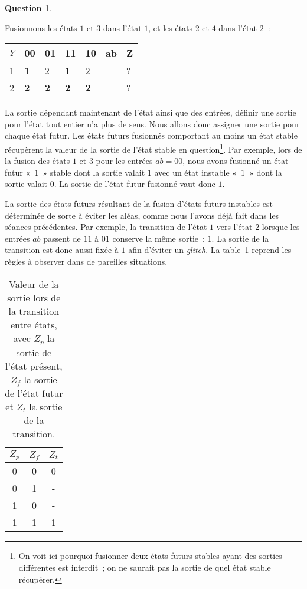 \documentclass[11pt,a4paper,dvipsnames,]{article}
\theoremstyle{definition}%
\newtheorem{Q}{Question}[] %
\begin{document}
\begin{Q}
{\begin{enumerate}
		Fusionnons les états $1$ et $3$ dans l'état $1$, et les états $2$ et $4$ dans l'état $2$~:
		\begin{center}
		\begin{tabular}{|l|l|l|l|l|l|l|}
		\hline
		$Y$ & 00         & 01         & 11         & 10         & ab & Z \\ \hline
		1           & \textbf{1} & 2          & \textbf{1}          & 2          &    & ? \\ \cline{1-5} \cline{7-7}
		2           & \textbf{2}          & \textbf{2} & \textbf{2} & \textbf{2} &    & ? \\ \cline{1-5} \cline{7-7}
		\end{tabular}
		\end{center}

		La sortie dépendant maintenant de l'état ainsi que des entrées, définir une sortie pour l'état tout entier n'a plus de sens.
		Nous allons donc assigner une sortie pour chaque état futur.
		Les états futurs fusionnés comportant au moins un état stable récupèrent la valeur de la sortie de l'état stable en question\footnote{On voit ici pourquoi fusionner deux états futurs stables ayant des sorties différentes est interdit~; on ne saurait pas la sortie de quel état stable récupérer.}.
		Par exemple, lors de la fusion des états $1$ et $3$ pour les entrées $ab = 00$, nous avons fusionné un état futur «~$1$~» stable dont la sortie valait $1$ avec un état instable «~$1$~» dont la sortie valait $0$.
		La sortie de l'état futur fusionné vaut donc $1$.

		La sortie des états futurs résultant de la fusion d'états futurs instables est déterminée de sorte à éviter les aléas, comme nous l'avons déjà fait dans les séances précédentes.
		Par exemple, la transition de l'état $1$ vers l'état $2$ lorsque les entrées $ab$ passent de $11$ à $01$ conserve la même sortie~: $1$.
		La sortie de la transition est donc aussi fixée à $1$ afin d'éviter un \textit{glitch}. La table~\ref{tab:sortie-transition} reprend les règles à observer dans de pareilles situations.
		\begin{table}[H]
			\centering
			\begin{tabular}{ccc}
			$Z_p$ & $Z_f$ & $Z_t$ \\ \hline
			0 & 0 & 0 \\
			0 & 1 & - \\
			1 & 0 & - \\
			1 & 1 & 1 \\
			\end{tabular}
			\caption{Valeur de la sortie lors de la transition entre états, avec $Z_p$ la sortie de l'état présent, $Z_f$ la sortie de l'état futur et $Z_t$ la sortie de la transition.}
			\label{tab:sortie-transition}
		\end{table}



\end{enumerate}}
\end{Q}
\end{document}
